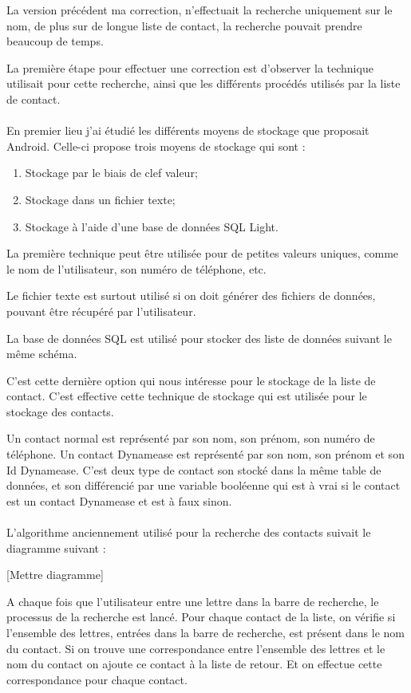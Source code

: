 La version précédent ma correction, n'effectuait la recherche uniquement sur le nom, de plus sur de longue liste de contact, la recherche pouvait prendre beaucoup de temps.

La première étape pour effectuer une correction est d'observer la technique utilisait pour cette recherche, ainsi que les différents procédés utilisés par la liste de contact.\\\\



En premier lieu j'ai étudié les différents moyens de stockage que proposait Android. Celle-ci propose trois moyens de stockage qui sont :

\begin{enumerate}
	\item Stockage par le biais de clef valeur;
	\item Stockage dans un fichier texte;
	\item Stockage à l'aide d'une base de données SQL Light.
\end{enumerate}

La première technique peut être utilisée pour de petites valeurs uniques, comme le nom de l'utilisateur, son numéro de téléphone, etc.

Le fichier texte est surtout utilisé si on doit générer des fichiers de données, pouvant être récupéré par l'utilisateur.

La base de données SQL est utilisé pour stocker des liste de données suivant le même schéma.

C'est cette dernière option qui nous intéresse pour le stockage de la liste de contact. C'est effective cette technique de stockage qui est utilisée pour le stockage des contacts.

Un contact normal est représenté par son nom, son prénom, son numéro de téléphone. Un contact Dynamease est représenté par son nom, son prénom et son Id Dynamease. C'est deux type de contact son stocké dans la même table de données, et son différencié par une variable booléenne qui est à vrai si le contact est un contact Dynamease et est à faux sinon.\\\\

L'algorithme anciennement utilisé pour la recherche des contacts suivait le diagramme suivant :

[Mettre diagramme]

A chaque fois que l'utilisateur entre une lettre dans la barre de recherche, le processus de la recherche est lancé. Pour chaque contact de la liste, on vérifie si l'ensemble des lettres, entrées dans la barre de recherche, est présent dans le nom du contact. Si on trouve une correspondance entre l'ensemble des lettres et le nom du contact on ajoute ce contact à la liste de retour. Et on effectue cette correspondance pour chaque contact.

